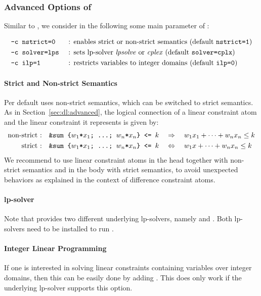 \subsubsection{Advanced Options of }

Similar to , we consider in the following some main parameter of : 

\begin{align*}
 &\texttt{-c nstrict=0} && \text{ : enables strict or non-strict semantics (default \texttt{nstrict=1})}\\
 &\texttt{-c solver=lps}&& \text{ : sets lp-solver \textit{lpsolve}{} or \textit{cplex}{} (default \texttt{solver=cplx})}\\
 &\texttt{-c ilp=1}     && \text{ : restricts variables to integer domains (default \texttt{ilp=0})}  
\end{align*}

\paragraph{Strict and Non-strict Semantics}
Per default  uses non-strict semantics, which can be switched to strict semantics. 
%
As in Section~\ref{sec:dl:advanced}, the logical connection of a linear constraint atom and the linear constraint it represents is given by:
\begin{align*}
 \text{non-strict :}\quad&\texttt{\&sum\text{ }\{$w_1$*$x_1$;\text{ }\dots;\text{ }$w_n$*$x_n$\}\text{ }<=\text{ }$k$} \quad\Rightarrow\quad w_1x_1+\dots+w_nx_n\leq k\\
 \text{strict :}\quad&\texttt{\&sum\text{ }\{$w_1$*$x_1$;\text{ }\dots;\text{ }$w_n$*$x_n$\}\text{ }<=\text{ }$k$} \quad \Leftrightarrow \quad w_1x+\dots+w_nx_n\leq k
\end{align*}
We recommend to use linear constraint atoms in the head together with non-strict semantics and in the body with strict semantics, 
to avoid unexpected behaviors as explained in the context of difference constraint atoms. 

\paragraph{lp-solver} 
Note that  provides two different underlying lp-solvers, namely \lpsolve{} and \cplex{}. 
%
Both lp-solvers need to be installed to run . 

\paragraph{Integer Linear Programming} 
If one is interested in solving linear constraints containing variables over integer domains, 
then this can be easily done by adding . 
%
This does only work if the underlying lp-solver supports this option. 



